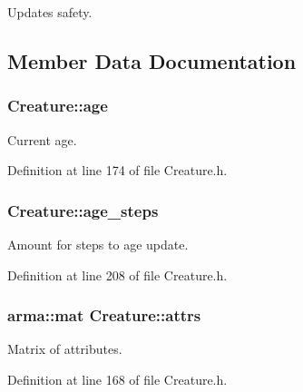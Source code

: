 Updates safety. 



\subsection{Member Data Documentation}
\hypertarget{classCreature_aa3544784cbb26961f214a39b49fd171e}{
\subsubsection[{age}]{ Creature\-::age\hspace{0.3cm}{\ttfamily [protected]}}}\label{classCreature_aa3544784cbb26961f214a39b49fd171e}


Current age. 



Definition at line 174 of file Creature.\-h.

\hypertarget{classCreature_aa9bf4d151801ecb1326cd734b341167d}{
\subsubsection[{age\-\_\-steps}]{ Creature\-::age\-\_\-steps\hspace{0.3cm}{\ttfamily [protected]}}}\label{classCreature_aa9bf4d151801ecb1326cd734b341167d}


Amount for steps to age update. 



Definition at line 208 of file Creature.\-h.

\hypertarget{classCreature_a641e41105d04d3faf56ca7a0132586e2}{
\subsubsection[{attrs}]{\setlength{\rightskip}{0pt plus 5cm}arma\-::mat Creature\-::attrs\hspace{0.3cm}{\ttfamily [protected]}}}\label{classCreature_a641e41105d04d3faf56ca7a0132586e2}


Matrix of attributes. 



Definition at line 168 of file Creature.\-h.

